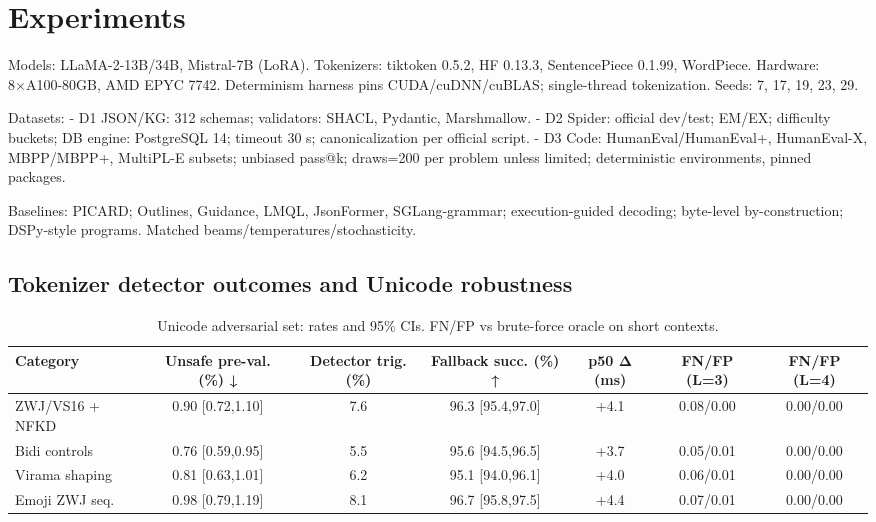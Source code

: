 \documentclass{article}
\begin{document}
\section{Experiments}
Models: LLaMA-2-13B/34B, Mistral-7B (LoRA). Tokenizers: tiktoken 0.5.2, HF 0.13.3, SentencePiece 0.1.99, WordPiece. Hardware: 8×A100-80GB, AMD EPYC 7742. Determinism harness pins CUDA/cuDNN/cuBLAS; single-thread tokenization. Seeds: 7, 17, 19, 23, 29.

Datasets: 
- D1 JSON/KG: 312 schemas; validators: SHACL, Pydantic, Marshmallow.
- D2 Spider: official dev/test; EM/EX; difficulty buckets; DB engine: PostgreSQL 14; timeout 30 s; canonicalization per official script.
- D3 Code: HumanEval/HumanEval+, HumanEval-X, MBPP/MBPP+, MultiPL-E subsets; unbiased pass@k; draws=200 per problem unless limited; deterministic environments, pinned packages.

Baselines: PICARD; Outlines, Guidance, LMQL, JsonFormer, SGLang-grammar; execution-guided decoding; byte-level by-construction; DSPy-style programs. Matched beams/temperatures/stochasticity.

\subsection{Tokenizer detector outcomes and Unicode robustness}
\begin{table}[H]
\centering
\small
\begin{tabular}{@{}lcccccc@{}}
\toprule
Category & Unsafe pre-val. (\%) ↓ & Detector trig. (\%) & Fallback succ. (\%) ↑ & p50 Δ (ms) & FN/FP (L=3) & FN/FP (L=4) \\
\midrule
ZWJ/VS16 + NFKD & 0.90 [0.72,1.10] & 7.6 & 96.3 [95.4,97.0] & +4.1 & 0.08/0.00 & 0.00/0.00 \\
Bidi controls   & 0.76 [0.59,0.95] & 5.5 & 95.6 [94.5,96.5] & +3.7 & 0.05/0.01 & 0.00/0.00 \\
Virama shaping  & 0.81 [0.63,1.01] & 6.2 & 95.1 [94.0,96.1] & +4.0 & 0.06/0.01 & 0.00/0.00 \\
Emoji ZWJ seq.  & 0.98 [0.79,1.19] & 8.1 & 96.7 [95.8,97.5] & +4.4 & 0.07/0.01 & 0.00/0.00 \\
\bottomrule
\end{tabular}
\caption{Unicode adversarial set: rates and 95\% CIs. FN/FP vs brute-force oracle on short contexts.}
\end{table}
\end{document}
